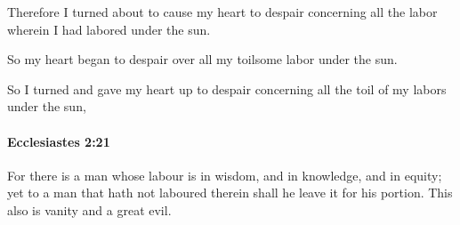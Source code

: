 			\begin{versebox}
					\item[BHS] 
					\item[LXX] 
					\item[ASV] Therefore I turned about to cause my heart to despair concerning all the labor wherein I had labored under the sun.
					\item[NIV] So my heart began to despair over all my toilsome labor under the sun.
					\item[NRSV] So I turned and gave my heart up to despair concerning all the toil of my labors under the sun,
			\end{versebox}

		\paragraph{Ecclesiastes 2:21} %
			\label{ECCLESIASTES-2-21}

			For there is a man whose labour is in wisdom, and in knowledge, and in equity; yet to a man that hath not laboured therein shall he leave it for his portion. This also is vanity and a great evil.

